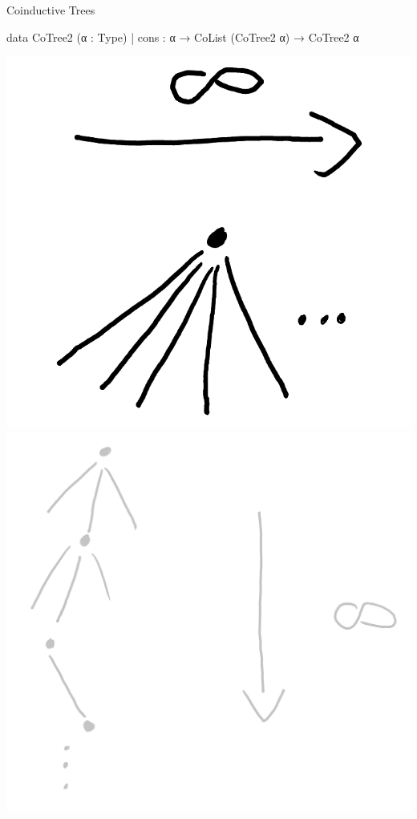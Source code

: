 \documentclass[t,12pt]{beamer}
\begin{document}


\begin{frame}[fragile]{Coinductive Trees}
    \vfill
\begin{leancode}
data CoTree2 (α : Type)
  | cons : α → CoList (CoTree2 α) → CoTree2 α
\end{leancode}

\medskip

{
    \hfill
    \includegraphics[scale=0.1]{tree_inf_wide.png}
    \hspace*{2.6cm}
    \includegraphics[scale=0.07]{tree_inf_deep_grey.png}    
    \hfill
}



     
\end{frame}
    
\end{document}

